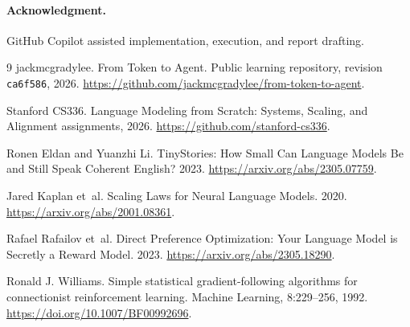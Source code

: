 \documentclass{article}
\begin{document}
\paragraph{Acknowledgment.}
GitHub Copilot assisted implementation, execution, and report drafting.

\begin{thebibliography}{9}
jackmcgradylee. From Token to Agent. Public learning repository,
revision \texttt{ca6f586}, 2026.
\url{https://github.com/jackmcgradylee/from-token-to-agent}.

Stanford CS336. Language Modeling from Scratch: Systems, Scaling,
and Alignment assignments, 2026.
\url{https://github.com/stanford-cs336}.

Ronen Eldan and Yuanzhi Li.
TinyStories: How Small Can Language Models Be and Still Speak
Coherent English? 2023. \url{https://arxiv.org/abs/2305.07759}.

Jared Kaplan et~al. Scaling Laws for Neural Language Models. 2020.
\url{https://arxiv.org/abs/2001.08361}.

Rafael Rafailov et~al. Direct Preference Optimization: Your Language
Model is Secretly a Reward Model. 2023.
\url{https://arxiv.org/abs/2305.18290}.

Ronald J. Williams. Simple statistical gradient-following algorithms
for connectionist reinforcement learning. Machine Learning,
8:229--256, 1992. \url{https://doi.org/10.1007/BF00992696}.
\end{thebibliography}
\end{document}
